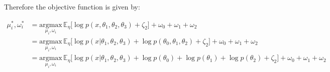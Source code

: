 \documentclass[10pt]{article}
\begin{document}
Therefore the objective function is given by:

\begin{align*}
  \mu_i^*, \omega_i^* &= \underset{\mu_i, \omega_i}{\text{argmax}}\,\mathbb{E}_\eta\big[\log p(x, \theta_1, \theta_2, \theta_3) + \zeta_2 \big] + \omega_0 + \omega_1 + \omega_2 \\
  &= \underset{\mu_i, \omega_i}{\text{argmax}}\,\mathbb{E}_\eta\big[\log p(x | \theta_1, \theta_2, \theta_3) + \log p(\theta_0, \theta_1, \theta_2) + \zeta_2 \big] + \omega_0 + \omega_1 + \omega_2 \\
  &= \underset{\mu_i, \omega_i}{\text{argmax}}\,\mathbb{E}_\eta\big[\log p(x | \theta_1, \theta_2, \theta_3) + \log p(\theta_0) + \log p (\theta_1) + \log p(\theta_2) + \zeta_2 \big] + \omega_0 + \omega_1 + \omega_2 \\
\end{align*}
\end{document}
